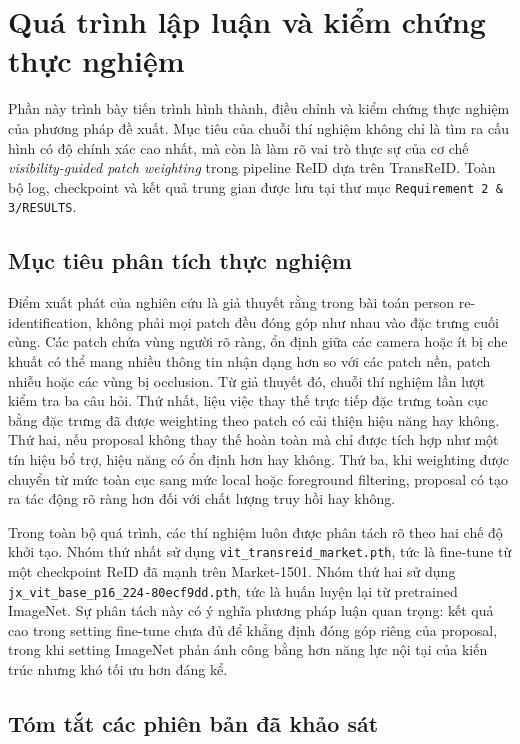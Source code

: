 \section{Quá trình lập luận và kiểm chứng thực nghiệm}

Phần này trình bày tiến trình hình thành, điều chỉnh và kiểm chứng thực nghiệm của phương pháp đề xuất. Mục tiêu của chuỗi thí nghiệm không chỉ là tìm ra cấu hình có độ chính xác cao nhất, mà còn là làm rõ vai trò thực sự của cơ chế \textit{visibility-guided patch weighting} trong pipeline ReID dựa trên TransReID. Toàn bộ log, checkpoint và kết quả trung gian được lưu tại thư mục \texttt{Requirement 2 \& 3/RESULTS}.

\subsection{Mục tiêu phân tích thực nghiệm}

Điểm xuất phát của nghiên cứu là giả thuyết rằng trong bài toán person re-identification, không phải mọi patch đều đóng góp như nhau vào đặc trưng cuối cùng. Các patch chứa vùng người rõ ràng, ổn định giữa các camera hoặc ít bị che khuất có thể mang nhiều thông tin nhận dạng hơn so với các patch nền, patch nhiễu hoặc các vùng bị occlusion. Từ giả thuyết đó, chuỗi thí nghiệm lần lượt kiểm tra ba câu hỏi. Thứ nhất, liệu việc thay thế trực tiếp đặc trưng toàn cục bằng đặc trưng đã được weighting theo patch có cải thiện hiệu năng hay không. Thứ hai, nếu proposal không thay thế hoàn toàn mà chỉ được tích hợp như một tín hiệu bổ trợ, hiệu năng có ổn định hơn hay không. Thứ ba, khi weighting được chuyển từ mức toàn cục sang mức local hoặc foreground filtering, proposal có tạo ra tác động rõ ràng hơn đối với chất lượng truy hồi hay không.

Trong toàn bộ quá trình, các thí nghiệm luôn được phân tách rõ theo hai chế độ khởi tạo. Nhóm thứ nhất sử dụng \texttt{vit\_transreid\_market.pth}, tức là fine-tune từ một checkpoint ReID đã mạnh trên Market-1501. Nhóm thứ hai sử dụng \texttt{jx\_vit\_base\_p16\_224-80ecf9dd.pth}, tức là huấn luyện lại từ pretrained ImageNet. Sự phân tách này có ý nghĩa phương pháp luận quan trọng: kết quả cao trong setting fine-tune chưa đủ để khẳng định đóng góp riêng của proposal, trong khi setting ImageNet phản ánh công bằng hơn năng lực nội tại của kiến trúc nhưng khó tối ưu hơn đáng kể.

\subsection{Tóm tắt các phiên bản đã khảo sát}

